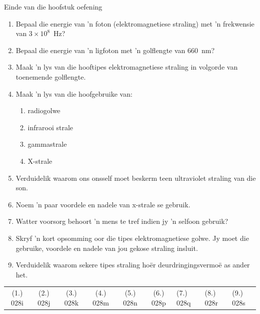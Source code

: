 \begin{eocexercises}{Einde van die hoofstuk oefening}
\begin{enumerate}[noitemsep, label=\textbf{\arabic*}. ] 
    \item Bepaal die energie van 'n foton (e\-lek\-tro\-mag\-ne\-tie\-se straling) met 'n frekwensie van $3\ensuremath{\times}{10}^{8}$~Hz?\newline
    \item Bepaal die energie van 'n ligfoton met 'n golflengte van 660~nm?\newline
    \item Maak 'n lys van die hooftipes elektromagnetiese straling in volgorde van toenemende golflengte.\newline
    \item Maak 'n lys van die hoofgebruike van:
\begin{enumerate}[noitemsep, label=\textbf{\alph*}. ] 
    \item radiogolwe
    \item infrarooi strale
    \item gammastrale
    \item X-strale
\end{enumerate}
\item Verduidelik waarom ons onsself moet beskerm teen ultraviolet straling van die son. \newline
\item Noem 'n paar voordele en nadele van x-strale se gebruik. \newline
\item Watter voorsorg behoort 'n mens te tref indien jy 'n selfoon gebruik? \newline
\item Skryf 'n kort opsomming oor die tipes elektromagnetiese golwe. Jy moet die gebruike, voordele en nadele van jou gekose straling insluit.\newline
\item Verduidelik waarom sekere tipes straling ho\"er deurdringingsvermo\"e as ander het.\newline
\end{enumerate}
  \label{m38779**end}
  \label{459e2bef85baf867f5850bc8338cad3a**end}
\practiceinfo
 \par \begin{tabular}[h]{cccccc}
 (1.) 028i  &  (2.) 028j  &  (3.) 028k  &  (4.) 028m  &  (5.) 028n  &  (6.) 028p  &  (7.) 028q  &  (8.) 028r  &  (9.) 028s  & \end{tabular}
\end{eocexercises}
